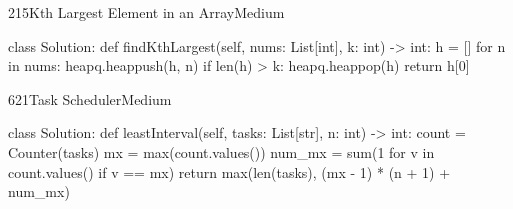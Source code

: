 \begin{problem}{215}{Kth Largest Element in an Array}{Medium}
\begin{code}
class Solution:
    def findKthLargest(self, nums: List[int], k: int) -> int:
        h = []
        for n in nums:
            heapq.heappush(h, n)
            if len(h) > k:
                heapq.heappop(h)
        return h[0]
\end{code}
\end{problem}

\begin{problem}{621}{Task Scheduler}{Medium}
\begin{code}
class Solution:
    def leastInterval(self, tasks: List[str], n: int) -> int:
        count = Counter(tasks)
        mx = max(count.values())
        num_mx = sum(1 for v in count.values() if v == mx)
        return max(len(tasks), (mx - 1) * (n + 1) + num_mx)
\end{code}
\end{problem}

